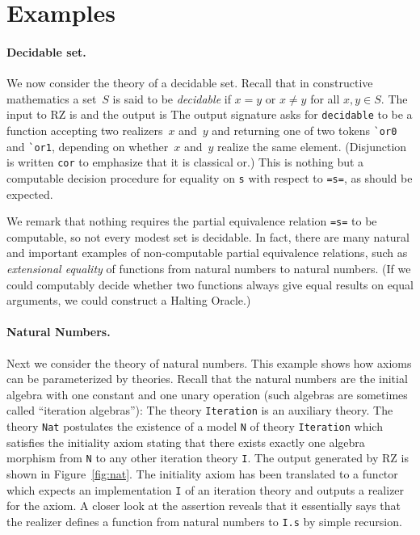 \section{Examples}
\label{sec:examples}

\paragraph{Decidable set.}
\label{sec:decidable-set}

We now consider the theory of a decidable set.
Recall that in constructive mathematics a set~$S$ is said to be
\emph{decidable} if $x = y$ or $x \neq y$ for all $x, y \in S$.
The input to RZ is
%
{\small{}}%
%
\noindent and the output is
%
{\small{}}
%
\noindent
The output signature asks for \Verb|decidable| to be a function
accepting two realizers~$x$ and~$y$ and returning one of two tokens
\Verb|`or0| and \Verb|`or1|, depending on whether~$x$ and~$y$ realize
the same element. (Disjunction is written \Verb|cor| to emphasize that
it is classical or.) This is nothing but a computable decision procedure
for equality on \Verb|s| with respect to \Verb|=s=|, as
should be expected. 

We remark that nothing requires the partial equivalence relation
\Verb|=s=| to be computable, so not every modest set is decidable. In
fact, there are many natural and important examples of non-computable partial
equivalence relations, such as \emph{extensional equality} of functions
from natural numbers to natural numbers. (If we could computably
decide whether two functions always give equal results on equal
arguments, we could construct a Halting Oracle.)

\paragraph{Natural Numbers.}
\label{sec:natural-numb}

Next we consider the theory of natural numbers. This example shows how
axioms can be parameterized by theories. Recall that the natural
numbers are the initial algebra with one constant and one unary
operation (such algebras are sometimes called ``iteration algebras''):
%
{\small{}}%
%
\noindent
The theory \Verb|Iteration| is an auxiliary theory. The theory
\Verb|Nat| postulates the existence of a model \Verb|N| of theory
\Verb|Iteration| which satisfies the initiality axiom stating that
there exists exactly one algebra morphism from \Verb|N| to any other
iteration theory \Verb|I|. The output generated by RZ is shown in
Figure~\ref{fig:nat}. The initiality axiom has been translated to a
functor which expects an implementation \Verb|I| of an iteration
theory and outputs a realizer for the axiom. A closer look at the
assertion reveals that it essentially says that the realizer defines a
function from natural numbers to \Verb|I.s| by simple recursion.

